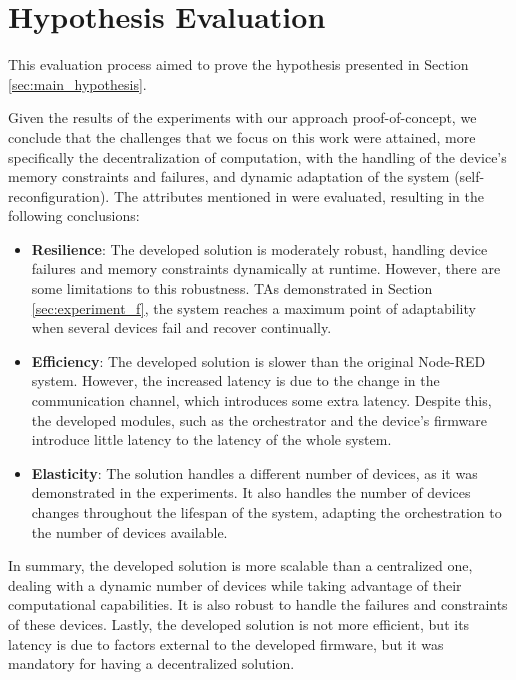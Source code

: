 \section{Hypothesis Evaluation}\label{sec:evaluation_hypothesis}

This evaluation process aimed to prove the hypothesis presented in Section \ref{sec:main_hypothesis}.

Given the results of the experiments with our approach proof-of-concept, we conclude that
the challenges that we focus on this work were attained, more specifically the decentralization of computation, with the handling of the device's memory constraints and failures, and dynamic adaptation of the system (self-reconfiguration). The attributes mentioned in  were evaluated, resulting in the following conclusions:

\begin{itemize}
    \item \textbf{Resilience}: The developed solution is moderately robust, handling device failures and memory constraints dynamically at runtime. However, there are some limitations to this robustness. TAs demonstrated in Section \ref{sec:experiment_f}, the system reaches a maximum point of adaptability when several devices fail and recover continually.
    \item \textbf{Efficiency}: The developed solution is slower than the original Node-RED system. However, the increased latency is due to the change in the communication channel, which introduces some extra latency. Despite this, the developed modules, such as the orchestrator and the device's firmware introduce little latency to the latency of the whole system.
    \item \textbf{Elasticity}: The solution handles a different number of devices, as it was demonstrated in the experiments. It also handles the number of devices changes throughout the lifespan of the system, adapting the orchestration to the number of devices available.
\end{itemize}

In summary, the developed solution is more scalable than a centralized one, dealing with a dynamic number of devices while taking advantage of their computational capabilities. It is also robust to handle the failures and constraints of these devices. Lastly, the developed solution is not more efficient, but its latency is due to factors external to the developed firmware, but it was mandatory for having a decentralized solution.

